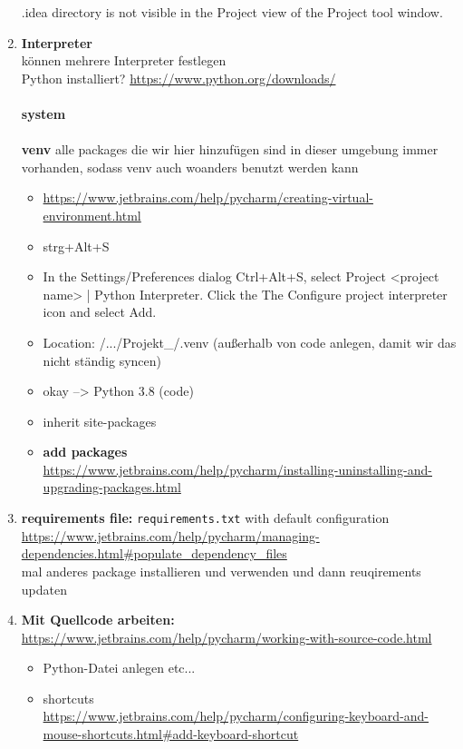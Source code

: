\begin{enumerate}
	.idea directory is not visible in the Project view of the Project tool window.
	\item \textbf{Interpreter}\\
	können mehrere Interpreter festlegen\\
	Python installiert? \url{https://www.python.org/downloads/}~\\~\\
	\textbf{system}\\~\\
	\textbf{venv} 
	alle packages die wir hier hinzufügen sind in dieser umgebung immer vorhanden, sodass venv auch woanders benutzt werden kann
	\begin{itemize}
		\item \url{https://www.jetbrains.com/help/pycharm/creating-virtual-environment.html}
		\item strg+Alt+S
		\item In the Settings/Preferences dialog Ctrl+Alt+S, select Project <project name> | Python Interpreter. Click the The Configure project interpreter icon and select Add.	
		\item Location: /.../Projekt\_/.venv  (außerhalb von code anlegen, damit wir das nicht ständig syncen)
		\item okay --> Python 3.8 (code)
		\item inherit site-packages
		\item \textbf{add packages}\\
		\url{https://www.jetbrains.com/help/pycharm/installing-uninstalling-and-upgrading-packages.html}\\		
	\end{itemize}
	\item \textbf{requirements file:} \texttt{requirements.txt} with default configuration\\
	\url{https://www.jetbrains.com/help/pycharm/managing-dependencies.html#populate_dependency_files}\\
	mal anderes package installieren und verwenden und dann reuqirements updaten
	\item \textbf{Mit Quellcode arbeiten:}\\ \url{https://www.jetbrains.com/help/pycharm/working-with-source-code.html}\\
	\begin{itemize}
		\item Python-Datei anlegen etc...
		\item shortcuts \\
		\url{https://www.jetbrains.com/help/pycharm/configuring-keyboard-and-mouse-shortcuts.html#add-keyboard-shortcut}

\end{itemize}
\end{enumerate}
